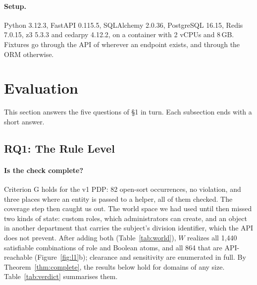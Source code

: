 \paragraph{Setup.} Python 3.12.3, FastAPI 0.115.5, SQLAlchemy 2.0.36, PostgreSQL 16.15, Redis 7.0.15, z3
5.3.3 and cedarpy 4.12.2, on a container with 2 vCPUs and 8\,GB. Fixtures go through the API of \sysname
wherever an endpoint exists, and through the ORM otherwise.

\section{Evaluation}
\label{sec:eval}

This section answers the five questions of \S1 in turn. Each subsection ends with a short answer.

\subsection{RQ1: The Rule Level}
\label{sec:l1}

\paragraph{Is the check complete?} Criterion G holds for the v1 PDP: 82 open-sort occurrences, no violation,
and three places where an entity is passed to a helper, all of them checked. The coverage step then caught us
out. The world space we had used until then missed two kinds of state: custom roles, which administrators can
create, and an object in another department that carries the subject's division identifier, which the API does
not prevent. After adding both (Table~\ref{tab:world}), $W$ realizes all 1{,}440 satisfiable combinations of
role and Boolean atoms, and all 864 that are API-reachable (Figure~\ref{fig:l1}b); clearance and sensitivity
are enumerated in full. By Theorem~\ref{thm:complete}, the results below hold for domains of any size.
Table~\ref{tab:verdict} summarises them.

